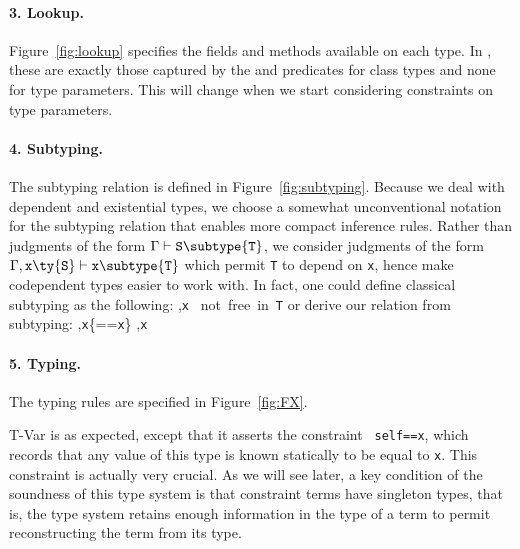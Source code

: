 \paragraph{3. Lookup.} Figure~\ref{fig:lookup} specifies the fields and methods available on each type. In \FXGL{\cdot}, these are exactly those captured by the \fields{} and \methods{} predicates for class types and none for type parameters. This will change when we start considering constraints on type parameters.

\paragraph{4. Subtyping.} The subtyping relation is defined in Figure~\ref{fig:subtyping}.
Because we deal with dependent and existential types, we choose a somewhat unconventional notation for the subtyping relation that enables more compact inference rules. Rather than judgments of the form $\Gamma\vdash{\tt S}\subtype{\tt T}$, we consider judgments of the form $\Gamma,{\tt x}\ty{\tt S}\vdash{\tt x}\subtype{\tt T}$ which permit {\tt T} to depend on {\tt x}, hence make codependent types easier to work with. In fact, one could define classical subtyping as the following:
\infrule
	{ \andalso \Gamma,{\tt x} ~\rm not~free~in~{\tt T}}
	{\Gamma{}}
or derive our relation from subtyping:
\infrule
	{\Gamma,{\tt x}\{\self=={\tt x}\}}
	{\Gamma,{\tt x}}

\paragraph{5. Typing.} The typing rules are specified in Figure~\ref{fig:FX}.

{\sc T-Var} is as expected, except that it asserts the constraint {\tt
self==x}, which records that any value of this type is known
statically to be equal to {\tt x}. This constraint is actually very
crucial. As we will see later, a key condition of the soundness of 
this type system is that constraint terms have singleton types, that is, the
type system retains enough information in the type of a term to permit
reconstructing the term from its type.


